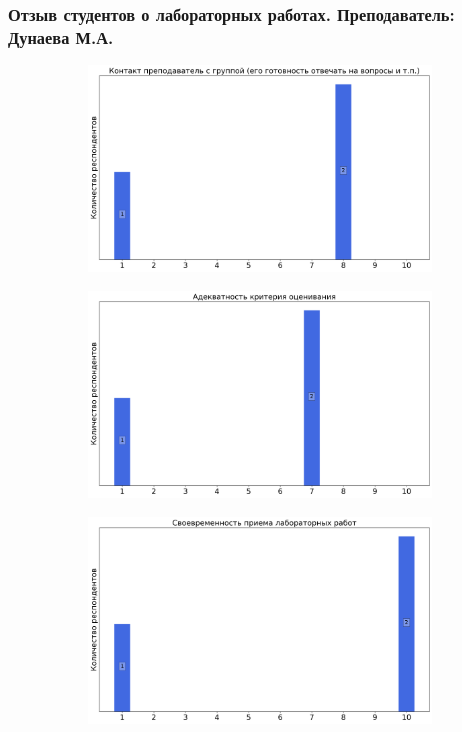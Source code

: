     \subsubsection{Отзыв студентов о лабораторных работах. Преподаватель: Дунаева М.А.}
		\begin{figure}[H]
			\centering
			\begin{subfigure}[b]{0.45\textwidth}
				\centering
				\includegraphics[width=\textwidth]{images/3 course/Аналоговая электроника/labniks-marks-Дунаева М.А.-0.png}
			\end{subfigure}
			\begin{subfigure}[b]{0.45\textwidth}
				\centering
				\includegraphics[width=\textwidth]{images/3 course/Аналоговая электроника/labniks-marks-Дунаева М.А.-1.png}
			\end{subfigure}
			\begin{subfigure}[b]{0.45\textwidth}
				\centering
				\includegraphics[width=\textwidth]{images/3 course/Аналоговая электроника/labniks-marks-Дунаева М.А.-2.png}

\end{subfigure}
\end{figure}
